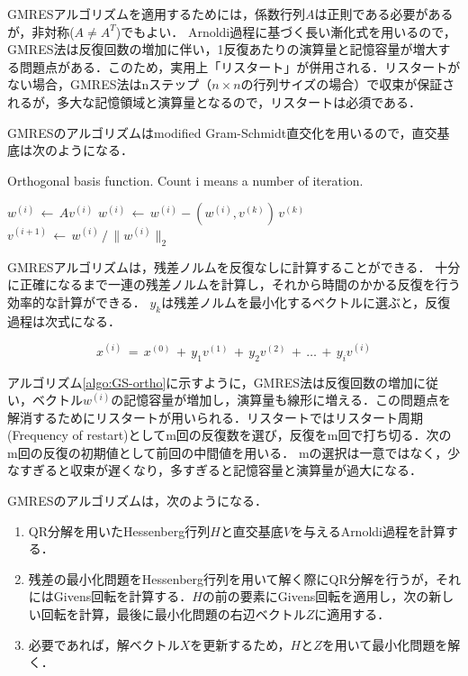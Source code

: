 GMRESアルゴリズムを適用するためには，係数行列$A$は正則である必要があるが，非対称($A \neq A^T$)でもよい．
Arnoldi過程に基づく長い漸化式を用いるので，GMRES法は反復回数の増加に伴い，1反復あたりの演算量と記憶容量が増大する問題点がある．このため，実用上「リスタート」が併用される．リスタートがない場合，GMRES法はnステップ（$n \times n$の行列サイズの場合）で収束が保証されるが，多大な記憶領域と演算量となるので，リスタートは必須である．

\vspace{3mm}
GMRESのアルゴリズムはmodified Gram-Schmidt直交化を用いるので，直交基底は次のようになる\cite{bahi:07}．

\begin{algorithm}
\caption{Orthogonal basis function. Count i means a number of iteration.}
\label{algo:GS-ortho}
\begin{algorithmic}

\State $w^{(i)} \,\gets \, A v^{(i)}$
\State $w^{(i)} \,\gets \, w^{(i)} - (w^{(i)}, v^{(k)})\, v^{(k)}$
\EndFor
\State $v^{(i+1)} \,\gets \, w^{(i)} \,/\, \|w^{(i)}\|_2$

\end{algorithmic}
\end{algorithm}


GMRESアルゴリズムは，残差ノルムを反復なしに計算することができる．
十分に正確になるまで一連の残差ノルムを計算し，それから時間のかかる反復を行う効率的な計算ができる．
$y_k$は残差ノルムを最小化するベクトルに選ぶと，反復過程は次式になる．

\begin{equation}
x^{(i)} \,=\, x^{(0)} \,+\, y_1 v^{(1)} \,+\, y_2 v^{(2)} \,+\, \dots \,+\, y_i v^{(i)}
\label{eq:GMRES iteration}
\end{equation}


アルゴリズム\ref{algo:GS-ortho}に示すように，GMRES法は反復回数の増加に従い，ベクトル$w^{(i)}$の記憶容量が増加し，演算量も線形に増える．この問題点を解消するためにリスタートが用いられる．リスタートではリスタート周期(Frequency of restart)としてm回の反復数を選び，反復をm回で打ち切る．次のm回の反復の初期値として前回の中間値を用いる．
mの選択は一意ではなく，少なすぎると収束が遅くなり，多すぎると記憶容量と演算量が過大になる．

\vspace{3mm}
GMRESのアルゴリズムは，次のようになる．
\begin{enumerate}
\item QR分解を用いたHessenberg行列$H$と直交基底$V$を与えるArnoldi過程を計算する．
\item 残差の最小化問題をHessenberg行列を用いて解く際にQR分解を行うが，それにはGivens回転を計算する．$H$の前の要素にGivens回転を適用し，次の新しい回転を計算，最後に最小化問題の右辺ベクトル$Z$に適用する．
\item 必要であれば，解ベクトル$X$を更新するため，$H$と$Z$を用いて最小化問題を解く．
\end{enumerate}



